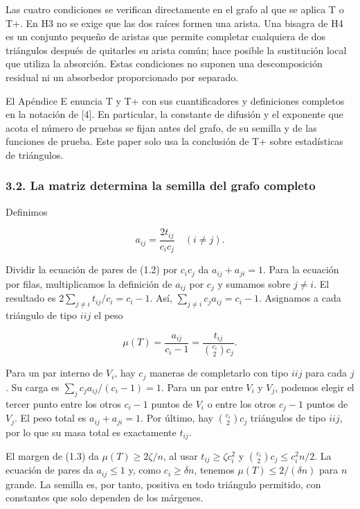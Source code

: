 \documentclass[spanish,11pt,a4paper]{article}
\begin{document}
Las cuatro condiciones se verifican directamente en el grafo al que se aplica T o T+. En H3 no se exige que las dos raíces formen una arista. Una bisagra de H4 es un conjunto pequeño de aristas que permite completar cualquiera de dos triángulos después de quitarles su arista común; hace posible la sustitución local que utiliza la absorción. Estas condiciones no suponen una descomposición residual ni un absorbedor proporcionado por separado.

El Apéndice E enuncia T y T+ con sus cuantificadores y definiciones completos en la notación de {[}4{]}. En particular, la constante de difusión y el exponente que acota el número de pruebas se fijan antes del grafo, de su semilla y de las funciones de prueba. Este paper solo usa la conclusión de T+ sobre estadísticas de triángulos.

\subsubsection{3.2. La matriz determina la semilla del grafo completo}\label{la-matriz-determina-la-semilla-del-grafo-completo}

Definimos

\[a_{ij}=\frac{2t_{ij}}{c_ic_j}\quad(i\ne j).\]

Dividir la ecuación de pares de (1.2) por \(c_ic_j\) da \(a_{ij}+a_{ji}=1\). Para la ecuación por filas, multiplicamos la definición de \(a_{ij}\) por \(c_j\) y sumamos sobre \(j\ne i\). El resultado es \(2\sum_{j\ne i}t_{ij}/c_i=c_i-1\). Así, \(\sum_{j\ne i}c_j a_{ij}=c_i-1\). Asignamos a cada triángulo de tipo \(iij\) el peso

\[\mu(T)=\frac{a_{ij}}{c_i-1}
=\frac{t_{ij}}{\binom{c_i}{2}c_j}.\tag{3.1}\]

Para un par interno de \(V_i\), hay \(c_j\) maneras de completarlo con tipo \(iij\) para cada \(j\). Su carga es \(\sum_jc_ja_{ij}/(c_i-1)=1\). Para un par entre \(V_i\) y \(V_j\), podemos elegir el tercer punto entre los otros \(c_i-1\) puntos de \(V_i\) o entre los otros \(c_j-1\) puntos de \(V_j\). El peso total es \(a_{ij}+a_{ji}=1\). Por último, hay \(\binom{c_i}{2}c_j\) triángulos de tipo \(iij\), por lo que su masa total es exactamente \(t_{ij}\).

El margen de (1.3) da \(\mu(T)\ge2\zeta/n\), al usar \(t_{ij}\ge\zeta c_i^2\) y \(\binom{c_i}{2}c_j\le c_i^2n/2\). La ecuación de pares da \(a_{ij}\le1\) y, como \(c_i\ge\delta n\), tenemos \(\mu(T)\le2/(\delta n)\) para \(n\) grande. La semilla es, por tanto, positiva en todo triángulo permitido, con constantes que solo dependen de los márgenes.
\end{document}

